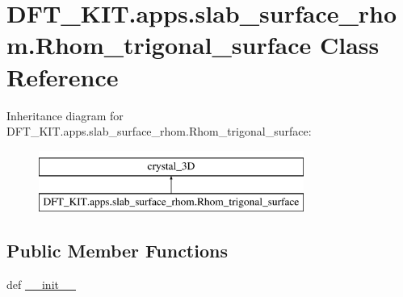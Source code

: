 \hypertarget{class_d_f_t___k_i_t_1_1apps_1_1slab__surface__rhom_1_1_rhom__trigonal__surface}{\section{D\+F\+T\+\_\+\+K\+I\+T.\+apps.\+slab\+\_\+surface\+\_\+rhom.\+Rhom\+\_\+trigonal\+\_\+surface Class Reference}
\label{class_d_f_t___k_i_t_1_1apps_1_1slab__surface__rhom_1_1_rhom__trigonal__surface}
}
Inheritance diagram for D\+F\+T\+\_\+\+K\+I\+T.\+apps.\+slab\+\_\+surface\+\_\+rhom.\+Rhom\+\_\+trigonal\+\_\+surface\+:\begin{figure}[H]
\begin{center}
\leavevmode
\includegraphics[height=2.000000cm]{class_d_f_t___k_i_t_1_1apps_1_1slab__surface__rhom_1_1_rhom__trigonal__surface}
\end{center}
\end{figure}
\subsection*{Public Member Functions}
\begin{DoxyCompactItemize}
\item 
def \hyperlink{class_d_f_t___k_i_t_1_1apps_1_1slab__surface__rhom_1_1_rhom__trigonal__surface_a4cf46ad804d400f760f89fccead8aa3f}{\+\_\+\+\_\+init\+\_\+\+\_\+}
\end{DoxyCompactItemize}
